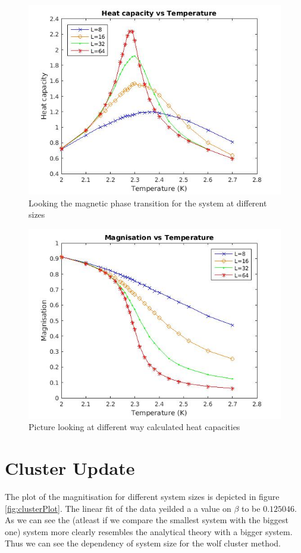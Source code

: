 \documentclass[11pt]{article}
\begin{document}
\begin{figure}[H]
	\centering
	\includegraphics[width=1\textwidth]{../../plots/phaseTrans}
	\caption{Looking the magnetic phase transition for the system at different sizes}
	\label{fig:phaseTrans}
\end{figure}

\begin{figure}[H]
	\centering
	\includegraphics[width=1\textwidth]{../../plots/mag}
	\caption{Picture looking at different way calculated heat capacities}
	\label{fig:mag}
\end{figure}

\section{Cluster Update}
The plot of the magnitisation for different system sizes is depicted in figure \ref{fig:clusterPlot}. The linear fit of the data yeilded a a value on $\beta$ to be $0.125046$. As we can see the (atleast if we compare the smallest system with the biggest one) system more clearly resembles the analytical theory with a bigger system. Thus we can see the dependency of system size for the wolf cluster method.
\end{document}
